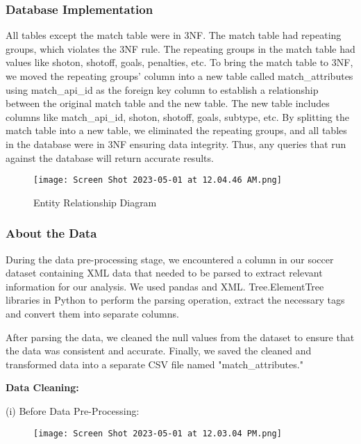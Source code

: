 \documentclass[lettersize]{IEEEtran}
\begin{document}
\vspace{1em}
\subsubsection{\textbf{Database Implementation}}
All tables except the match table were in 3NF. The match table had repeating groups, which violates the 3NF rule. The repeating groups in the match table had values like shoton, shotoff, goals, penalties, etc.
To bring the match table to 3NF, we moved the repeating groups' column into a new table called match\_attributes using match\_api\_id as the foreign key column to establish a relationship between the original match table and the new table. The new table includes columns like match\_api\_id, shoton, shotoff, goals, subtype, etc.
By splitting the match table into a new table, we eliminated the repeating groups, and all tables in the database were in 3NF ensuring data integrity. Thus, any queries that run against the database will return accurate results.
\vspace{-\baselineskip}
\begin{figure}[H]
    \centering
    \texttt{[image: Screen Shot 2023-05-01 at 12.04.46 AM.png]}
    \caption{Entity Relationship Diagram}
    \label{fig:image_label}
\end{figure}

\subsubsection{\textbf{About the Data}}
During the data pre-processing stage, we encountered a column in our soccer dataset containing XML data that needed to be parsed to extract relevant information for our analysis. We used pandas and XML. Tree.ElementTree libraries in Python to perform the parsing operation, extract the necessary tags and convert them into separate columns.

After parsing the data, we cleaned the null values from the dataset to ensure that the data was consistent and accurate. Finally, we saved the cleaned and transformed data into a separate CSV file named "match\_attributes."\

\textbf{Data Cleaning:}\

(i) Before Data Pre-Processing:
\vspace{-2\baselineskip}
\begin{figure}[H]
    \centering
    \texttt{[image: Screen Shot 2023-05-01 at 12.03.04 PM.png]}
\end{figure}
\end{document}
